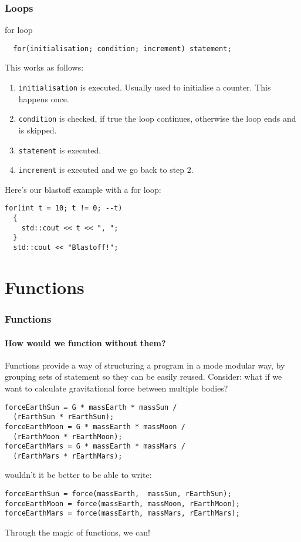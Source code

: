\documentclass{beamer}
\begin{document}
\begin{frame}[fragile]
  \frametitle{Loops}
  
  \begin{block}{for loop}
    \begin{lstlisting}
  for(initialisation; condition; increment) statement;
    \end{lstlisting}
    This works as follows:
    \begin{enumerate}
      \item<2->{\texttt{initialisation} is executed.  Usually used to initialise a counter.  This happens once.}
      \item<3->{\texttt{condition} is checked, if true the loop continues, otherwise the loop ends and is skipped.}
      \item<4->{\texttt{statement} is executed.}
      \item<5->{\texttt{increment} is executed and we go back to step 2.}
    \end{enumerate}
    \pause[6]
    Here's our blastoff example with a for loop:
    \begin{lstlisting}[belowskip=0pt]
  for(int t = 10; t != 0; --t)
  {
    std::cout << t << ", ";
  }
  std::cout << "Blastoff!";
    \end{lstlisting}
    
  \end{block}
\end{frame}

\section{Functions}

\begin{frame}[fragile]
  \frametitle{Functions}
  \framesubtitle{How would we function without them?}
  Functions provide a way of structuring a program in a mode modular way, by grouping sets of statement so they can be easily reused.\newline
  \pause
  Consider: what if we want to calculate gravitational force between multiple bodies?
  \begin{lstlisting}
forceEarthSun = G * massEarth * massSun /
  (rEarthSun * rEarthSun);
forceEarthMoon = G * massEarth * massMoon /
  (rEarthMoon * rEarthMoon);
forceEarthMars = G * massEarth * massMars /
  (rEarthMars * rEarthMars);
  \end{lstlisting}
  \pause
  wouldn't it be better to be able to write:
  \begin{lstlisting}
forceEarthSun = force(massEarth,  massSun, rEarthSun);
forceEarthMoon = force(massEarth, massMoon, rEarthMoon);
forceEarthMars = force(massEarth, massMars, rEarthMars);
  \end{lstlisting}
  Through the magic of functions, we can!
\end{frame}
\end{document}
